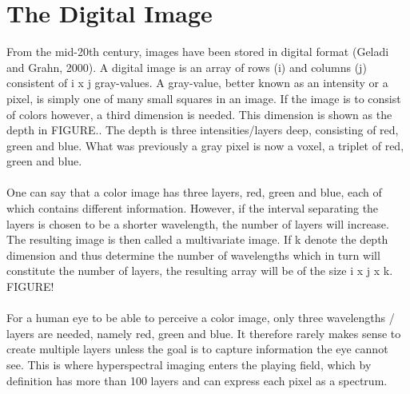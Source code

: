 \section{The Digital Image}
From the mid-20th century, images have been stored in digital format (Geladi and Grahn, 2000). A digital image is an array of rows (i) and columns (j) consistent of i x j gray-values. A gray-value, better known as an intensity or a pixel, is simply one of many small squares in an image. If the image is to consist of colors however, a third dimension is needed. This dimension is shown as the depth in FIGURE.. The depth is three intensities/layers deep, consisting of red, green and blue. What was previously a gray pixel is now a voxel, a triplet of red, green and blue.
\\\\
One can say that a color image has three layers, red, green and blue, each of which contains different information. However, if the interval separating the layers is chosen to be a shorter wavelength, the number of layers will increase. The resulting image is then called a multivariate image. If k denote the depth dimension and thus determine the number of wavelengths which in turn will constitute the number of layers, the resulting array will be of the size i x j x k. FIGURE!
\\\\
For a human eye to be able to perceive a color image, only three wavelengths / layers are needed, namely red, green and blue. It therefore rarely makes sense to create multiple layers unless the goal is to capture information the eye cannot see. This is where hyperspectral imaging enters the playing field, which by definition has more than 100 layers and can express each pixel as a spectrum.

